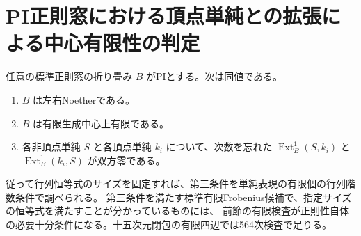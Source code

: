 \section{PI正則窓における頂点単純との拡張による中心有限性の判定}
\label{sec:pi-vertex-extension-criterion}
\begin{theorem}\label{thm:pi-vertex-extension-criterion}
任意の標準正則窓の折り畳み $B$ がPIとする。次は同値である。
\begin{enumerate}
\item $B$ は左右Noetherである。
\item $B$ は有限生成中心上有限である。
\item 各非頂点単純 $S$ と各頂点単純 $k_i$ について、次数を忘れた
$\operatorname{Ext}^1_B(S,k_i)$ と $\operatorname{Ext}^1_B(k_i,S)$ が双方零である。
\end{enumerate}
従って行列恒等式のサイズを固定すれば、第三条件を単純表現の有限個の行列階数条件で調べられる。
第三条件を満たす標準有限Frobenius候補で、指定サイズの恒等式を満たすことが分かっているものには、
前節の有限検査が正則性自体の必要十分条件になる。十五次元閉包の有限四辺では564次検査で足りる。
\end{theorem}
